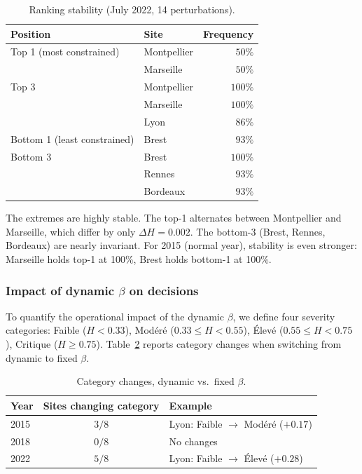 \documentclass[11pt,a4paper]{article}
\begin{document}
\begin{table}[h]
\centering
\small
\caption{Ranking stability (July 2022, 14 perturbations).}
\label{tab:stability}
\begin{tabular}{llr}
\toprule
Position & Site & Frequency \\
\midrule
Top 1 (most constrained)    & Montpellier & $50\%$ \\
                            & Marseille   & $50\%$ \\
Top 3                       & Montpellier & $100\%$ \\
                            & Marseille   & $100\%$ \\
                            & Lyon        & $86\%$ \\
Bottom 1 (least constrained) & Brest      & $93\%$ \\
Bottom 3                    & Brest       & $100\%$ \\
                            & Rennes      & $93\%$ \\
                            & Bordeaux    & $93\%$ \\
\bottomrule
\end{tabular}
\end{table}

The extremes are highly stable. The top-1 alternates between Montpellier and Marseille, which differ by only $\Delta H = 0.002$. The bottom-3 (Brest, Rennes, Bordeaux) are nearly invariant. For 2015 (normal year), stability is even stronger: Marseille holds top-1 at 100\%, Brest holds bottom-1 at 100\%.

\subsubsection{Impact of dynamic $\beta$ on decisions}

To quantify the operational impact of the dynamic $\beta$, we define four severity categories: Faible ($H < 0.33$), Modéré ($0.33 \leq H < 0.55$), Élevé ($0.55 \leq H < 0.75$), Critique ($H \geq 0.75$). Table~\ref{tab:betaimpact} reports category changes when switching from dynamic to fixed $\beta$.

\begin{table}[h]
\centering
\small
\caption{Category changes, dynamic vs.\ fixed $\beta$.}
\label{tab:betaimpact}
\begin{tabular}{lcl}
\toprule
Year & Sites changing category & Example \\
\midrule
2015 & $3/8$ & Lyon: Faible $\to$ Modéré ($+0.17$) \\
2018 & $0/8$ & No changes \\
2022 & $5/8$ & Lyon: Faible $\to$ Élevé ($+0.28$) \\
\bottomrule
\end{tabular}
\end{table}
\end{document}
